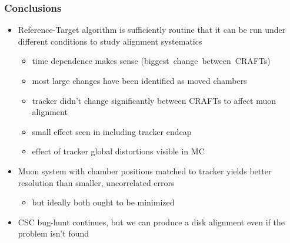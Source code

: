 \documentclass[compress]{beamer}
\begin{document}

\begin{frame}
\frametitle{Conclusions}
\begin{itemize}\setlength{\itemsep}{0.5 cm}
\item Reference-Target algorithm is sufficiently routine that it can
  be run under different conditions to study alignment systematics
\begin{itemize}
\item time dependence makes sense \mbox{(biggest change between CRAFTs)\hspace{-1 cm}}
\item most large changes have been identified as moved chambers
\item tracker didn't change significantly between CRAFTs to affect muon alignment
\item small effect seen in including tracker endcap
\item effect of tracker global distortions visible in MC
\end{itemize}

\item Muon system with chamber positions matched to tracker yields
  better resolution than smaller, uncorrelated errors
\begin{itemize}
\item but ideally both ought to be minimized
\end{itemize}

\item CSC bug-hunt continues, but we can produce a disk alignment even if the problem isn't found
\end{itemize}
\label{numpages}
\end{frame}
\end{document}

